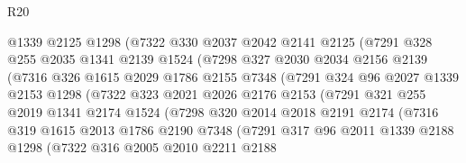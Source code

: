 \begin{lexlean}{R20}
\begin{coremodule}
                  @1339
                  @2125
                  @1298
                  (@7322
                    @330
                    @2037
                    @2042
                    @2141
                    @2125
                    (@7291
                      @328
                      @255
                      @2035
                      @1341
                      @2139
                      @1524
                      (@7298
                        @327
                        @2030
                        @2034
                        @2156
                        @2139
                        (@7316
                          @326
                          @1615
                          @2029
                          @1786
                          @2155
                          @7348
                          (@7291
                            @324
                            @96
                            @2027
                            @1339
                            @2153
                            @1298
                            (@7322
                              @323
                              @2021
                              @2026
                              @2176
                              @2153
                              (@7291
                                @321
                                @255
                                @2019
                                @1341
                                @2174
                                @1524
                                (@7298
                                  @320
                                  @2014
                                  @2018
                                  @2191
                                  @2174
                                  (@7316
                                    @319
                                    @1615
                                    @2013
                                    @1786
                                    @2190
                                    @7348
                                    (@7291
                                      @317
                                      @96
                                      @2011
                                      @1339
                                      @2188
                                      @1298
                                      (@7322
                                        @316
                                        @2005
                                        @2010
                                        @2211
                                        @2188

\end{coremodule}
\end{lexlean}
